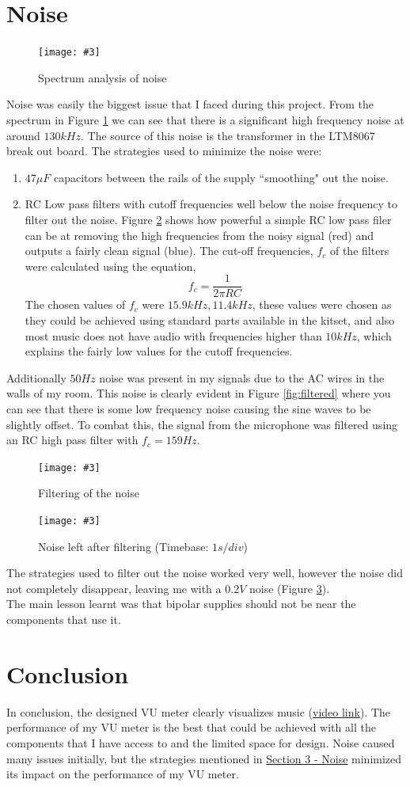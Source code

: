 \documentclass[10pt]{article}
\newcommand{\img}[5]{

    \begin{figure}[h]
        \begin{center}
        \texttt{[image: \#3]} 
         \caption{#4}
        \label{fig:#5}      
        \end{center}
    
    \end{figure}

}
\begin{document}
\section{Noise}
\label{sec:noise}
\img{.8}{1}{spectrum.png}{Spectrum analysis of noise}{spectrum}
\FloatBarrier
\noindent
Noise was easily the biggest issue that I faced during this project. From the spectrum in Figure \ref{fig:spectrum} we can see that there is a significant high frequency noise at around $130kHz$. The source of this noise is the transformer in the LTM8067 break out board. The strategies used to minimize the noise were:
\begin{enumerate}
    \item $47\mu F$ capacitors between the rails of the supply ``smoothing" out the noise.
    \item RC Low pass filters with cutoff frequencies well below the noise frequency to filter out the noise. Figure \ref{fig:lp} shows how powerful a simple RC low pass filer can be at removing the high frequencies from the noisy signal (red) and outputs a fairly clean signal (blue). The cut-off frequencies, $f_c$ of the filters were calculated using the equation,
    $$f_c=\frac{1}{2\pi RC}$$
    The chosen values of $f_c$ were $15.9kHz , 11.4kHz$, these values were chosen as they could be achieved using standard parts available in the kitset, and also most music does not have audio with frequencies higher than $10kHz$, which explains the fairly low values for the cutoff frequencies.
\end{enumerate}
\noindent
Additionally $50Hz$ noise was present in my signals due to the AC wires in the walls of my room. This noise is clearly evident in Figure \ref{fig:filtered} where you can see that there is some low frequency noise causing the sine waves to be slightly offset. To combat this, the signal from the microphone was filtered using an RC high pass filter with $f_c=159Hz$.


\img{.7}{1}{lp.PNG}{Filtering of the noise}{lp}
\FloatBarrier
\img{.7}{1}{noise.jpg}{Noise left after filtering (Timebase: $1s/div$)}{noise}
\FloatBarrier

\noindent
The strategies used to filter out the noise worked very well, however the noise did not completely disappear, leaving me with a $0.2V$ noise (Figure \ref{fig:noise}).\\ The main lesson learnt was that bipolar supplies should not be near the components that use it.
\section{Conclusion}
In conclusion, the designed VU meter clearly visualizes music (\href{https://drive.google.com/file/d/1vEgUyoO1fMyMp6ZBtADJIG7F9Pvy-P7P/view?usp=sharing}{video link}). The performance of my VU meter is the best that could be achieved with all the components that I have access to and the limited space for design. Noise caused many issues initially, but the strategies mentioned in \hyperref[sec:noise]{Section 3 - Noise} minimized its impact on the performance of my VU meter.
\end{document}
